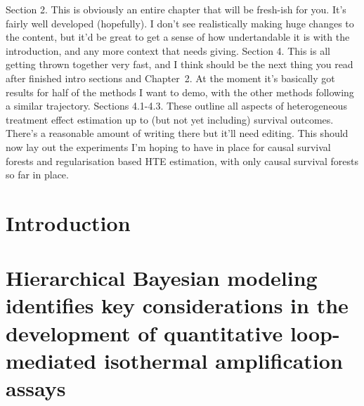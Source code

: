 \documentclass[12pt,twoside,openright]{report}
\theoremstyle{definition}
\begin{document}
{\begin{outline}
    \1 Section 2. This is obviously an entire chapter that will be fresh-ish for you. It's fairly well developed (hopefully). I don't see realistically making huge changes to the content, but it'd be great to get a sense of how undertandable it is with the introduction, and any more context that needs giving.
    \1 Section 4. This is all getting thrown together very fast, and I think should be the next thing you read after finished intro sections and Chapter~2. At the moment it's basically got results for half of the methods I want to demo, with the other methods following a similar trajectory. 
        \2 Sections 4.1-4.3. These outline all aspects of heterogeneous treatment effect estimation up to (but not yet including) survival outcomes. There's a reasonable amount of writing there but it'll need editing.
         This should now lay out the experiments I'm hoping to have in place for causal survival forests and regularisation based HTE estimation, with only causal survival forests so far in place.
    
\end{outline}
}

\chapter{Introduction \label{chap:intro}}




\chapter{Hierarchical Bayesian modeling identifies key considerations in the
development of quantitative loop-mediated isothermal amplification
assays \label{chap:lamp_modelling}}
\end{document}
